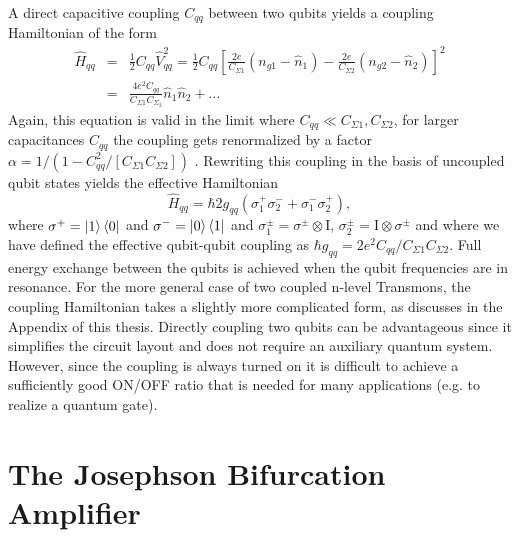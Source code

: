 A direct capacitive coupling $C_{qq}$ between two qubits yields a coupling Hamiltonian of the form
%
\begin{eqnarray}
\hat{H}_{qq} & = & \frac{1}{2}C_{qq}\hat{V}_{qq}^2 = \frac{1}{2}C_{qq}\left[\frac{2e}{C_{\Sigma 1}}(n_{g1}-\hat{n}_1)-\frac{2e}{C_{\Sigma 2}}(n_{g2}-\hat{n}_2)\right]^2 \\
& = & \frac{4e^2 C_{qq}}{C_{\Sigma 1}C_{\Sigma_2}}\hat{n}_1\hat{n}_2+\hdots \label{eq:cqed_capacitive_coupling}
\end{eqnarray}
%
Again, this equation is valid in the limit where $C_{qq} \ll C_{\Sigma 1},C_{\Sigma 2}$, for larger capacitances $C_{qq}$ the coupling gets renormalized by a factor $\alpha = 1/(1-C_{qq}^2/[C_{\Sigma 1}C_{\Sigma 2}])$ \citep{nguyen_cooper_2008}. Rewriting this coupling in the basis of uncoupled qubit states yields the effective Hamiltonian
%
\begin{equation}
\hat{H}_{qq} = \hbar 2 g_{qq}\left(\sigma^+_1\sigma^-_2+\sigma^-_1\sigma^+_2\right), \label{eq:cqed_qubit_interaction_hamiltonian}
\end{equation}
%
where $\sigma^+=\left| 1 \right>\left< 0 \right|$ and $\sigma^-=\left| 0 \right>\left< 1 \right|$ and $\sigma_1^\pm=\sigma^\pm\otimes \mathrm{I}$, $\sigma_2^\pm = \mathrm{I}\otimes \sigma^\pm$ and where we have defined the effective qubit-qubit coupling as $\hbar g_{qq} = 2e^2 C_{qq}/C_{\Sigma 1}C_{\Sigma 2}$. Full energy exchange between the qubits is achieved when the qubit frequencies are in resonance. For the more general case of two coupled n-level Transmons, the coupling Hamiltonian takes a slightly more complicated form, as discusses in the Appendix of this thesis. Directly coupling two qubits can be advantageous since it simplifies the circuit layout and does not require an auxiliary quantum system. However, since the coupling is always turned on it is difficult to achieve a sufficiently good ON/OFF ratio that is needed for many applications (e.g. to realize a quantum gate).

\section{The Josephson Bifurcation Amplifier}

